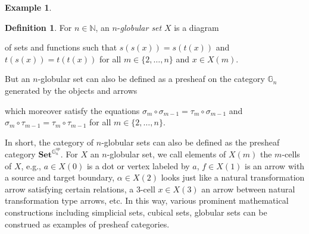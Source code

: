 \documentclass[11pt]{book}
\theoremstyle{definition}
\newtheorem{example}{Example}[section]
\theoremstyle{definition}
\newtheorem{definition}{Definition}[section]
\theoremstyle{definition}
\theoremstyle{theorem}
\theoremstyle{definition}
\begin{document}
\begin{example}
			\begin{definition}
			For $n \in \mathbb{N}$, an $n$-\textit{globular set} $X$ is a diagram 
			\begin{center} 
			\end{center} 
		of sets and functions such that $s(s(x)) = s(t(x))$ and $t(s(x)) = t(t(x))$ for all $m \in \{2,\dots,n\}$ and $x \in X(m)$. \par 
		But an $n$-globular set can also be defined as a presheaf on the category $\mathbb{G}_n$ generated by the objects and arrows 
		\begin{center} 
		\end{center}
	which moreover satisfy the equations $\sigma_m \circ \sigma_{m-1} = \tau_m \circ \sigma_{m-1}$ and $\sigma_m \circ \tau_{m-1} = \tau_m \circ \tau_{m-1}$ for all $m \in \{2,\dots, n\}$.  
			\end{definition}
	In short, the category of $n$-globular sets can also be defined as the presheaf category $\textbf{Set}^{\mathbb{G}_n^{op}}$. For $X$ an $n$-globular set, we call elements of $X(m)$ the $m$-cells of $X$, e.g., $a \in X(0)$ is a dot or vertex labeled by $a$, $f \in X(1)$ is an arrow with a source and target boundary, $\alpha \in X(2)$ looks just like a natural transformation arrow satisfying certain relations, a 3-cell $x \in X(3)$ an arrow between natural transformation type arrows, etc. In this way, various prominent mathematical constructions including simplicial sets, cubical sets, globular sets can be construed as examples of presheaf categories.\par 

\end{example}
\end{document}
